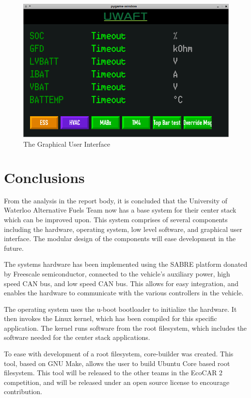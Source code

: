 \documentclass[ece]{uw-wkrpt}
\begin{document}
\begin{figure}
    \centering
    \includegraphics[width=6in]{gui}
    \caption[The Graphical User Interface]{The Graphical User Interface}
    \label{ref:gui}
\end{figure}

\section{Conclusions}

From the analysis in the report body, it is concluded that the University of
Waterloo Alternative Fuels Team now has a base system for their center stack
which can be improved upon. This system comprises of several components
including the hardware, operating system, low level software, and graphical user
interface. The modular design of the components will ease development in the
future.

The systems hardware has been implemented using the SABRE platform donated by
Freescale semiconductor, connected to the vehicle's auxiliary power, high speed
CAN bus, and low speed CAN bus. This allows for easy integration, and enables
the hardware to communicate with the various controllers in the vehicle.

The operating system uses the u-boot bootloader to initialize the hardware. It
then invokes the Linux kernel, which has been compiled for this specific
application. The kernel runs software from the root filesystem, which includes
the software needed for the center stack applications.

To ease with development of a root filesystem, core-builder was created. This
tool, based on GNU Make, allows the user to build Ubuntu Core based root
filesystem. This tool will be released to the other teams in the EcoCAR 2
competition, and will be released under an open source license to encourage
contribution.
\end{document}
